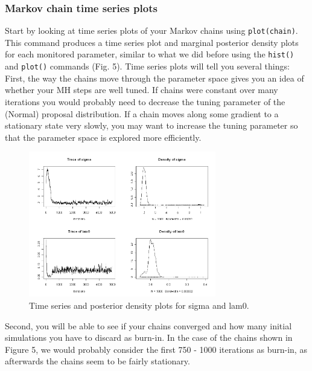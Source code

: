 \subsubsection{Markov chain time series plots}
Start by looking at time series plots of your Markov chains using \verb#plot(chain)#. This command produces a time series plot and marginal posterior density plots for each monitored parameter, similar to what we did before using the \verb#hist()# and \verb#plot()# commands (Fig. 5). Time series plots will tell you several things: 
First, the way the chains move through the parameter space gives you an idea of whether your MH steps are well tuned. If chains were constant over many iterations you would probably need to decrease the tuning parameter of the (Normal) proposal distribution. If a chain moves along some gradient to a stationary state very slowly, you may want to increase the tuning parameter so that the parameter space is explored more efficiently. 


\begin{figure}
\begin{center}
\includegraphics[height=2.5in]{figs/timeseries}
\end{center}
\caption{Time series and posterior density plots for sigma and lam0.} 
\label{timeseries.fig}
\end{figure}


Second, you will be able to see if your chains converged and how many initial simulations you have to discard as burn-in. In the case of the chains shown in Figure 5, we would probably consider the first 750 - 1000 iterations as burn-in, as afterwards the chains seem to be fairly stationary. 

